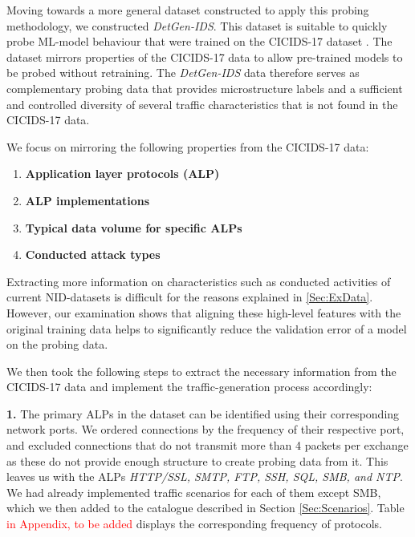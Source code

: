 \documentclass[runningheads]{llncs}
\begin{document}

Moving towards a more general dataset constructed to apply this probing methodology, 
we constructed \textit{DetGen-IDS}. This dataset is suitable to quickly probe ML-model behaviour that were trained on the CICIDS-17 dataset \cite{sharafaldin2018toward}. The dataset mirrors properties of the CICIDS-17 data to allow pre-trained models to be probed without retraining.
The \textit{DetGen-IDS} data therefore serves as complementary probing data that provides microstructure labels and a sufficient and controlled diversity of several traffic characteristics that is not found in the CICIDS-17 data.

We focus on mirroring the following properties from the CICIDS-17 data:
\begin{enumerate}

\item \textbf{Application layer protocols (ALP)}
\item \textbf{ALP implementations}
\item \textbf{Typical data volume for specific ALPs}
\item \textbf{Conducted attack types}

\end{enumerate}

Extracting more information on characteristics such as conducted activities of current NID-datasets is difficult for the reasons explained in \ref{Sec:ExData}. However, our examination shows that aligning these high-level features with the original training data helps to significantly reduce the validation error of a model on the probing data.

We then took the following steps to extract the necessary information from the CICIDS-17 data and implement the traffic-generation process accordingly:

\textbf{1.} The primary ALPs in the dataset can be identified using their corresponding network ports. We ordered connections by the frequency of their respective port, and excluded connections that do not transmit more than 4 packets per exchange as these do not provide enough structure to create probing data from it. This leaves us with the ALPs \textit{HTTP/SSL, SMTP, FTP, SSH, SQL, SMB, and NTP}. We had already implemented traffic scenarios for each of them except SMB, which we then added to the catalogue described in Section \ref{Sec:Scenarios}. Table \textcolor{red}{in Appendix, to be added} displays the corresponding frequency of protocols.
\end{document}

